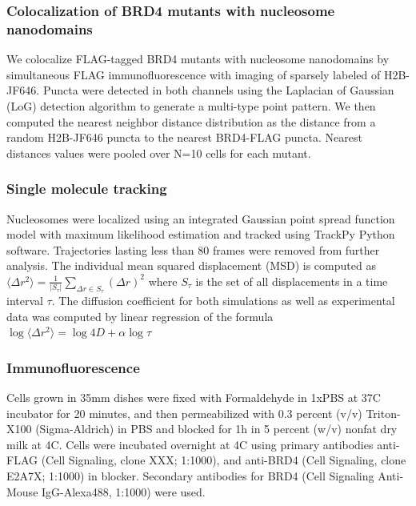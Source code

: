 \subsubsection{Colocalization of BRD4 mutants with nucleosome nanodomains}

We colocalize FLAG-tagged BRD4 mutants with nucleosome nanodomains by simultaneous FLAG immunofluorescence with imaging of sparsely labeled of H2B-JF646. Puncta were detected in both channels using the Laplacian of Gaussian (LoG) detection algorithm to generate a multi-type point pattern. We then computed the nearest neighbor distance distribution as the distance from a random H2B-JF646 puncta to the nearest BRD4-FLAG puncta. Nearest distances values were pooled over N=10 cells for each mutant. 

\subsubsection{Single molecule tracking}

Nucleosomes were localized using an integrated Gaussian point spread function model with maximum likelihood estimation \parencite{Smith2010,Huang2013} and tracked using TrackPy Python software.  Trajectories lasting less than 80 frames were removed from further analysis. The individual mean squared displacement (MSD) is computed as $\langle \Delta r^{2}\rangle = \frac{1}{\lvert S_{\tau}\lvert}\sum_{\Delta r \in S_{\tau}}(\Delta r)^{2}$
where $S_\tau$ is the set of all displacements in a time interval $\tau$. The diffusion coefficient for both simulations as well as experimental data was computed by linear regression of the formula $\log\langle \Delta r^{2}\rangle  = \log 4D + \alpha \log \tau$

\subsubsection{Immunofluorescence}
Cells grown in 35mm dishes were fixed with Formaldehyde in 1xPBS at 37C incubator for 20 minutes, and then permeabilized with 0.3 percent (v/v) Triton-X100 (Sigma-Aldrich) in PBS and blocked for 1h in 5 percent (w/v) nonfat dry milk at 4C. Cells were incubated overnight at 4C using primary antibodies anti-FLAG (Cell Signaling, clone XXX; 1:1000), and anti-BRD4 (Cell Signaling, clone E2A7X; 1:1000)  in blocker. Secondary antibodies for BRD4 (Cell Signaling Anti-Mouse IgG-Alexa488, 1:1000) were used. 

